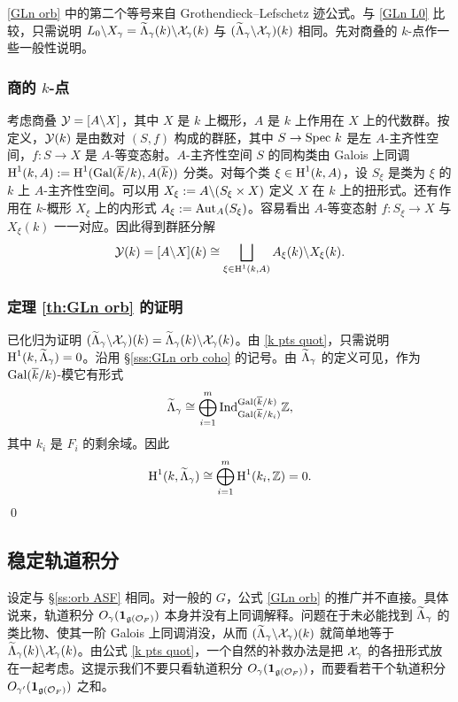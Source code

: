 \eqref{GLn orb} 中的第二个等号来自 Grothendieck--Lefschetz 迹公式。与 \eqref{GLn L0} 比较，只需说明 $L_{0}\backslash X_{\gamma}=\widetilde{\Lambda}_{\gamma}(k)\backslash \mathcal{X}_{\gamma}(k)$ 与 $(\widetilde{\Lambda}_{\gamma}\backslash\mathcal{X}_{\gamma})(k)$ 相同。先对商叠的 $k$-点作一些一般性说明。

\subsubsection{商的 $k$-点}\label{sss:k pts quot} 考虑商叠 $\mathcal{Y}=[A\backslash X]$，其中 $X$ 是 $k$ 上概形，$A$ 是 $k$ 上作用在 $X$ 上的代数群。按定义，$\mathcal{Y}(k)$ 是由数对 $(S, f)$ 构成的群胚，其中 $S\to \textup{Spec}\  k$ 是左 $A$-主齐性空间，$f:S\to X$ 是 $A$-等变态射。$A$-主齐性空间 $S$ 的同构类由 Galois 上同调 $\textup{H}^{1}({k, A}):=\textup{H}^{1}({\textup{Gal}(\overline{k}/k),A(\overline{k})})$ 分类。对每个类 $\xi\in \textup{H}^{1}({k,A})$，设 $S_{\xi}$ 是类为 $\xi$ 的 $k$ 上 $A$-主齐性空间。可以用 $X_{\xi}:=A\backslash (S_{\xi}\times X)$ 定义 $X$ 在 $k$ 上的扭形式。还有作用在 $k$-概形 $X_{\xi}$ 上的内形式 $A_{\xi}:=\textup{Aut}_{A}(S_{\xi})$。容易看出 $A$-等变态射 $f:S_{\xi}\to X$ 与 $X_{\xi}(k)$ 一一对应。因此得到群胚分解
\begin{equation}\label{k pts quot}
\mathcal{Y}(k)=[A\backslash X](k)\cong\bigsqcup_{\xi\in\textup{H}^{1}({k,A})}A_{\xi}(k)\backslash X_{\xi}(k).
\end{equation}

\subsubsection{定理 \ref{th:GLn orb} 的证明} 已化归为证明 $(\widetilde{\Lambda}_{\gamma}\backslash\mathcal{X}_{\gamma})(k)= \widetilde{\Lambda}_{\gamma}(k)\backslash \mathcal{X}_{\gamma}(k)$。由 \eqref{k pts quot}，只需说明 $\textup{H}^{1}({k,\widetilde{\Lambda}_{\gamma}})=0$。沿用 \S\ref{sss:GLn orb coho} 的记号。由 $\widetilde{\Lambda}_{\gamma}$ 的定义可见，作为 $\textup{Gal}(\overline{k}/k)$-模它有形式
\begin{equation*}
\widetilde{\Lambda}_{\gamma}\cong \bigoplus_{i=1}^{m}\textup{Ind}^{\textup{Gal}(\overline{k}/k)}_{\textup{Gal}(\overline{k}/k_{i})}\mathbb{Z},
\end{equation*}
其中 $k_{i}$ 是 $F_{i}$ 的剩余域。因此
\begin{equation*}
\textup{H}^{1}({k,\widetilde{\Lambda}_{\gamma}})\cong\bigoplus_{i=1}^{m}\textup{H}^{1}({k_{i},\mathbb{Z}})=0.
\end{equation*}
\qed

\subsection{稳定轨道积分} 设定与 \S\ref{ss:orb ASF} 相同。对一般的 $G$，公式 \eqref{GLn orb} 的推广并不直接。具体说来，轨道积分 $O_{\gamma}(\mathbf{1}_{\mathfrak{g}(\mathcal{O}_{F})})$ 本身并没有上同调解释。问题在于未必能找到 $\widetilde{\Lambda}_{\gamma}$ 的类比物、使其一阶 Galois 上同调消没，从而 $(\widetilde{\Lambda}_{\gamma}\backslash\mathcal{X}_{\gamma})(k)$ 就简单地等于 $\widetilde{\Lambda}_{\gamma}(k)\backslash \mathcal{X}_{\gamma}(k)$。由公式 \eqref{k pts quot}，一个自然的补救办法是把 $\mathcal{X}_{\gamma}$ 的各扭形式放在一起考虑。这提示我们不要只看轨道积分 $O_{\gamma}(\mathbf{1}_{\mathfrak{g}(\mathcal{O}_{F})})$，而要看若干个轨道积分 $O_{\gamma'}(\mathbf{1}_{\mathfrak{g}(\mathcal{O}_{F})})$ 之和。

